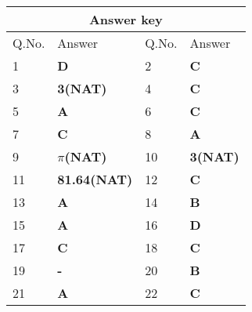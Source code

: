 \begin{table}[H]
	\centering
	\begin{tabular}{|p{1.5cm}|p{1.7cm}||p{1.5cm}|p{1.5cm}|}
		\hline
		\multicolumn{4}{|c|}{\textbf{Answer key}}\\\hline\hline
		\rowcolor{ocrel}Q.No.&Answer&Q.No.&Answer\\\hline
		1&\textbf{D} &2&\textbf{C}\\\hline 
		3&\textbf{3(NAT)} &4&\textbf{C} \\\hline
		5&\textbf{A} &6&\textbf{C} \\\hline
		7&\textbf{C}&8&\textbf{A}\\\hline
		9&\textbf{$\pi$(NAT)}&10&\textbf{3(NAT)}\\\hline
		11&\textbf{81.64(NAT)} &12&\textbf{C}\\\hline
		13&\textbf{A}& 14&\textbf{B}\\\hline
		15&\textbf{A}&16 &\textbf{D}\\\hline
		17&\textbf{C}&18&\textbf{C}\\\hline
		19&\textbf{-} &20&\textbf{B}\\\hline
		21&\textbf{A}&22&\textbf{C}\\\hline
	\end{tabular}
\end{table}


